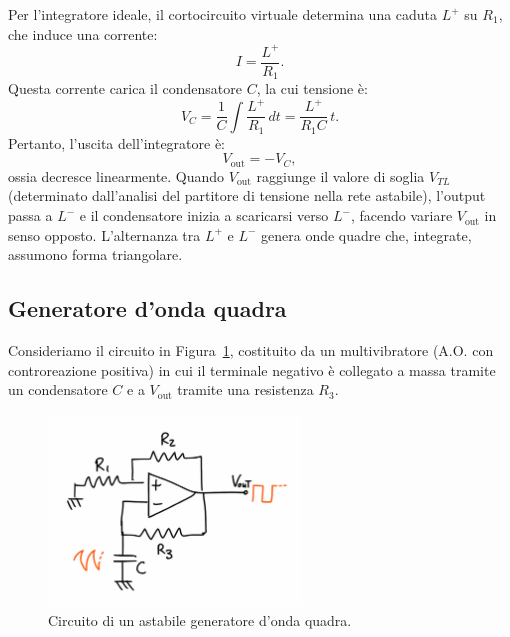 Per l’integratore ideale, il cortocircuito virtuale determina una caduta \(L^+\) su \(R_1\), che induce una corrente:
\[
I = \frac{L^+}{R_1}.
\]
Questa corrente carica il condensatore \(C\), la cui tensione è:
\[
V_C = \frac{1}{C}\int \frac{L^+}{R_1}\, dt = \frac{L^+}{R_1C}\, t.
\]
Pertanto, l’uscita dell’integratore è:
\[
V_{\text{out}} = -V_C,
\]
ossia decresce linearmente. Quando \(V_{\text{out}}\) raggiunge il valore di soglia \(V_{TL}\) (determinato dall’analisi del partitore di tensione nella rete astabile), l’output passa a \(L^-\) e il condensatore inizia a scaricarsi verso \(L^-\), facendo variare \(V_{\text{out}}\) in senso opposto. L’alternanza tra \(L^+\) e \(L^-\) genera onde quadre che, integrate, assumono forma triangolare.

\newpage
\subsection{Generatore d’onda quadra}

Consideriamo il circuito in Figura~\ref{fig:onda_quad}, costituito da un multivibratore (A.O. con controreazione positiva) in cui il terminale negativo è collegato a massa tramite un condensatore \(C\) e a \(V_{\text{out}}\) tramite una resistenza \(R_3\).\\[2mm]
\begin{figure}[H]
    \centering
    \includegraphics[width=0.6\textwidth]{images/1.6.2.1.png}
    \caption{Circuito di un astabile generatore d’onda quadra.}
    \label{fig:onda_quad}
\end{figure}

